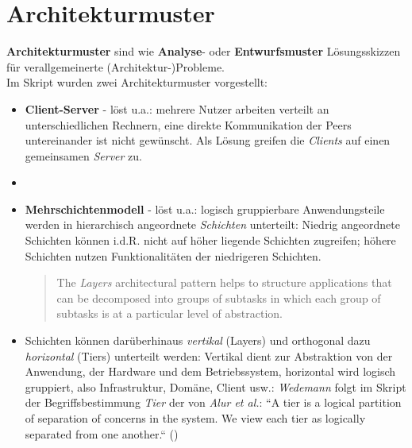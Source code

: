 \section{Architekturmuster}

\begin{tcolorbox}[title=Architekturmuster]

    \textbf{Architekturmuster} sind wie \textbf{Analyse}- oder \textbf{Entwurfsmuster} Lösungsskizzen für verallgemeinerte (Architektur-)Probleme.\\
    Im Skript wurden zwei Architekturmuster vorgestellt:

    \begin{itemize}
        \item \textbf{Client-Server} - löst u.a.: mehrere Nutzer arbeiten verteilt an unterschiedlichen Rechnern, eine direkte Kommunikation der Peers untereinander ist nicht gewünscht. Als Lösung greifen die \textit{Clients} auf einen gemeinsamen \textit{Server} zu.
        \item[]
        \item \textbf{Mehrschichtenmodell} - löst u.a.: logisch gruppierbare Anwendungsteile werden in hierarchisch angeordnete \textit{Schichten} unterteilt: Niedrig angeordnete Schichten können i.d.R. nicht auf höher liegende Schichten zugreifen; höhere Schichten nutzen Funktionalitäten der niedrigeren Schichten.\\
        \blockquote[{\cite[31, Hervorhebung i.O.]{BMRS96}}]{
            The \textit{Layers} architectural pattern helps to structure applications that can be decomposed into groups of subtasks in which each group of subtasks is at a particular level of abstraction.
        }.
        \item[] Schichten können darüberhinaus \textit{vertikal} (Layers) und orthogonal dazu \textit{horizontal} (Tiers) unterteilt werden: Vertikal dient zur Abstraktion von der Anwendung, der Hardware und dem Betriebssystem, horizontal wird logisch gruppiert, also Infrastruktur, Domäne, Client usw.: \textit{Wedemann} folgt im Skript der Begriffsbestimmung \textit{Tier} der von \textit{Alur et al.}:  ``A tier is a logical partition of separation of concerns in the system. We view each tier as logically separated from one another.`` (\cite[120]{ACM03})
    \end{itemize}

\end{tcolorbox}